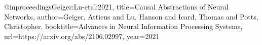 @inproceedings{Geiger:Lu-etal:2021,
    title={Causal Abstractions of Neural Networks},
    author={Geiger, Atticus  and  Lu, Hanson  and  Icard, Thomas  and Potts, Christopher},
    booktitle={Advances in Neural Information Processing Systems},
    url={https://arxiv.org/abs/2106.02997},
    year={2021}}